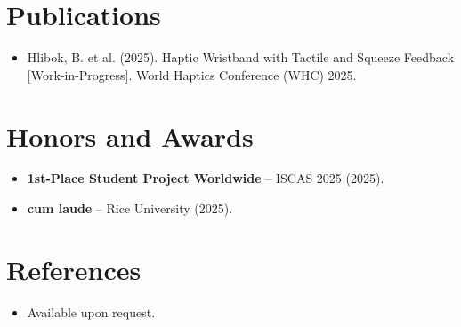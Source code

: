 \documentclass[11pt,a4paper,sans]{moderncv}
\begin{document}

\section{Publications}
\vspace{1pt}
\begin{itemize}
\item Hlibok, B. et al. (2025). Haptic Wristband with Tactile and Squeeze Feedback [Work-in-Progress]. World Haptics Conference (WHC) 2025.
\end{itemize}


\section{Honors and Awards}
\vspace{1pt}
\begin{itemize}
\item{\textbf{1st-Place Student Project Worldwide} -- ISCAS 2025 (2025).}
\item{\textbf{cum laude} -- Rice University (2025).}
\end{itemize}


\section{References}
\vspace{1pt}
\begin{itemize}
\item{Available upon request.}
\end{itemize}
\end{document}
